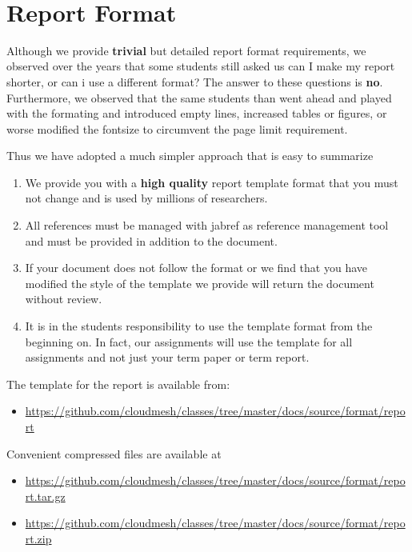 \FILENAME\

\section{Report Format}\label{report-format}

Although we provide \textbf{trivial} but detailed report format
requirements, we observed over the years that some students still asked
us can I make my report shorter, or can i use a different format? The
answer to these questions is \textbf{no}. Furthermore, we observed that
the same students than went ahead and played with the formating and
introduced empty lines, increased tables or figures, or worse modified
the fontsize to circumvent the page limit requirement.

Thus we have adopted a much simpler approach that is easy to summarize

\begin{enumerate}
\def\labelenumi{\arabic{enumi}.}

\item
  We provide you with a \textbf{high quality} report template format
  that you must not change and is used by millions of researchers.
\item
  All references must be managed with jabref as reference management
  tool and must be provided in addition to the document.
\item
  If your document does not follow the format or we find that you have
  modified the style of the template we provide will return the document
  without review.
\item
  It is in the students responsibility to use the template format from
  the beginning on. In fact, our assignments will use the template for
  all assignments and not just your term paper or term report.
\end{enumerate}

The template for the report is available from:

\begin{itemize}

\item
  \url{https://github.com/cloudmesh/classes/tree/master/docs/source/format/report}
\end{itemize}

Convenient compressed files are available at

\begin{itemize}

\item
  \url{https://github.com/cloudmesh/classes/tree/master/docs/source/format/report.tar.gz}
\item
  \url{https://github.com/cloudmesh/classes/tree/master/docs/source/format/report.zip}
\end{itemize}

